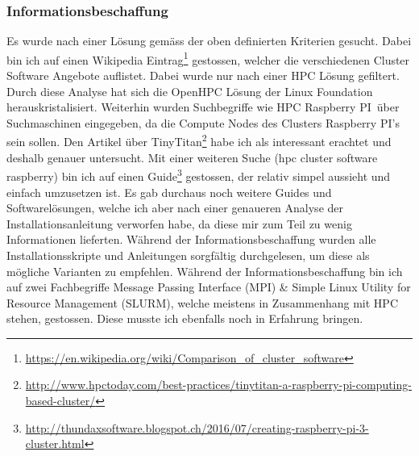 \subsubsection{Informationsbeschaffung}
Es wurde nach einer Lösung gemäss der oben definierten Kriterien gesucht. Dabei bin ich auf einen Wikipedia Eintrag\footnote{\url{https://en.wikipedia.org/wiki/Comparison\_of\_cluster\_software}} gestossen, welcher die verschiedenen Cluster Software Angebote auflistet. Dabei wurde nur nach einer HPC Lösung gefiltert. Durch diese Analyse hat sich die OpenHPC Lösung der Linux Foundation herauskristalisiert. Weiterhin wurden Suchbegriffe wie \grqq HPC Raspberry PI\grqq \ über Suchmaschinen eingegeben, da die Compute Nodes des Clusters Raspberry PI's sein sollen. Den Artikel über TinyTitan\footnote{\url{http://www.hpctoday.com/best-practices/tinytitan-a-raspberry-pi-computing-based-cluster/}} habe ich als interessant erachtet und deshalb genauer untersucht.
Mit einer weiteren Suche (hpc cluster software raspberry) bin ich auf einen Guide\footnote{\url{http://thundaxsoftware.blogspot.ch/2016/07/creating-raspberry-pi-3-cluster.html}} gestossen, der relativ simpel aussieht und einfach umzusetzen ist. Es gab durchaus noch weitere Guides und Softwarelösungen, welche ich aber nach einer genaueren Analyse der Installationsanleitung verworfen habe, da diese mir zum Teil zu wenig Informationen lieferten. Während der Informationsbeschaffung wurden alle Installationsskripte und Anleitungen sorgfältig durchgelesen, um diese als mögliche Varianten zu empfehlen. Während der Informationsbeschaffung bin ich auf zwei Fachbegriffe Message Passing Interface (MPI) \& Simple Linux Utility for Resource Management (SLURM), welche meistens in Zusammenhang mit HPC stehen, gestossen. Diese musste ich ebenfalls noch in Erfahrung bringen.





